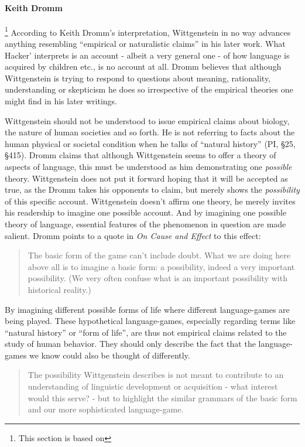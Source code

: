 \documentclass{article}
\begin{document}
\paragraph{Keith Dromm}\footnote{This section is based on }%
According to Keith Dromm's interpretation, Wittgenstein in no way advances anything resembling ``empirical or naturalistic claims'' in his later work. What Hacker' interprets is an account - albeit a very general one - of  how language is acquired by children etc., is no account at all. Dromm believes that although Wittgenstein is trying to respond to questions about meaning, rationality, understanding or skepticism he does so irrespective of the empirical theories one might find in his later writings.

Wittgenstein should not be understood to issue empirical claims about biology, the nature of human societies and so forth. He is not referring to facts about the human physical or societal condition when he talks of ``natural history'' (PI, §25, §415). Dromm claims that although Wittgenstein seems to offer a theory of aspects of language, this must be understood as him demonstrating one \textit{possible} theory. Wittgenstein does not put it forward hoping that it will be accepted as true, as the Dromm takes his opponents to claim, but merely shows the \textit{possibility} of this specific account. Wittgenstein doesn't affirm one theory, he merely invites his readership to imagine one possible account. And by imagining one possible theory of language, essential features of the phenomenon in question are made salient. Dromm points to a quote in \textit{On Cause and Effect} to this effect:
\begin{quote}
The basic form of the game can't include doubt. What we are doing here above all is to imagine a basic form: a possibility, indeed a very important possibility. (We very often confuse what is an important possibility with historical reality.) %
\end{quote}
By imagining different possible forms of life where different language-games are being played. These hypothetical language-games, especially regarding terms like ``natural history'' or ``form of life'', are thus not empirical claims related to the study of human behavior. They should only describe the fact that the language-games we know could also be thought of differently.
\begin{quote}
The possibility Wittgenstein describes is not meant to contribute to an understanding of linguistic development or acquisition - what interest would this serve? - but to highlight the similar grammars of the basic form and our more sophisticated language-game. %
\end{quote}
\end{document}
